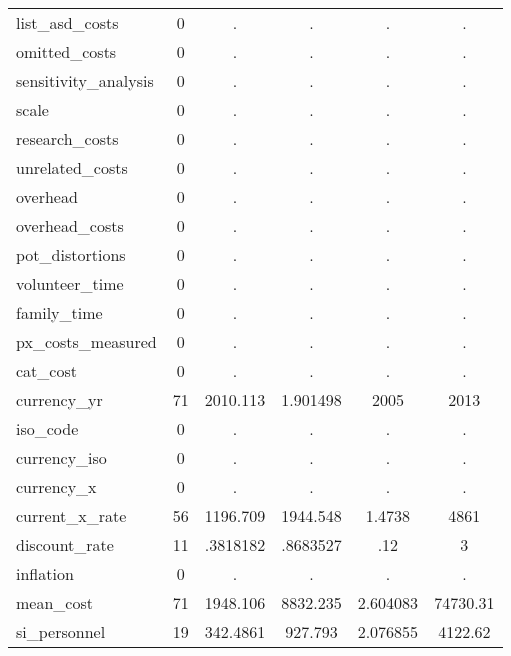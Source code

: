 \begin{table}[htbp]
\begin{tabular}{l*{1}{ccccc}}
list\_asd\_costs&           0&           .&           .&           .&           .\\
omitted\_costs&           0&           .&           .&           .&           .\\
sensitivity\_analysis&           0&           .&           .&           .&           .\\
scale       &           0&           .&           .&           .&           .\\
research\_costs&           0&           .&           .&           .&           .\\
unrelated\_costs&           0&           .&           .&           .&           .\\
overhead    &           0&           .&           .&           .&           .\\
overhead\_costs&           0&           .&           .&           .&           .\\
pot\_distortions&           0&           .&           .&           .&           .\\
volunteer\_time&           0&           .&           .&           .&           .\\
family\_time &           0&           .&           .&           .&           .\\
px\_costs\_measured&           0&           .&           .&           .&           .\\
cat\_cost    &           0&           .&           .&           .&           .\\
currency\_yr &          71&    2010.113&    1.901498&        2005&        2013\\
iso\_code    &           0&           .&           .&           .&           .\\
currency\_iso&           0&           .&           .&           .&           .\\
currency\_x  &           0&           .&           .&           .&           .\\
current\_x\_rate&          56&    1196.709&    1944.548&      1.4738&        4861\\
discount\_rate&          11&    .3818182&    .8683527&         .12&           3\\
inflation   &           0&           .&           .&           .&           .\\
mean\_cost   &          71&    1948.106&    8832.235&    2.604083&    74730.31\\
si\_personnel&          19&    342.4861&     927.793&    2.076855&     4122.62\\

\end{tabular}
\end{table}
